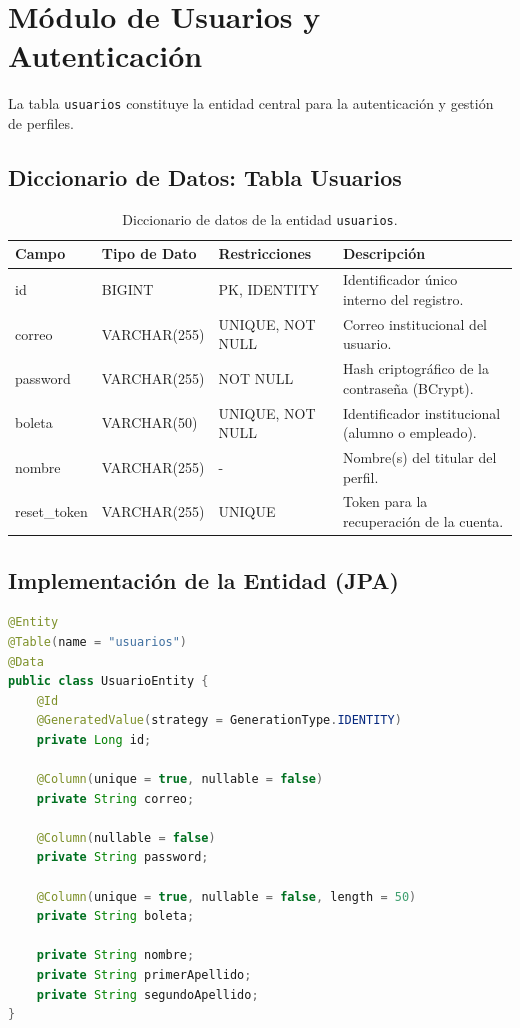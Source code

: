 \section{Módulo de Usuarios y Autenticación}
La tabla \texttt{usuarios} constituye la entidad central para la autenticación y gestión de perfiles.

\subsection{Diccionario de Datos: Tabla Usuarios}
\begin{table}[H]
\centering
\small
\begin{tabularx}{\textwidth}{|l|l|l|X|}
\hline
\rowcolor{azulESCOM} 
\color{white}\textbf{Campo} & \color{white}\textbf{Tipo de Dato} & \color{white}\textbf{Restricciones} & \color{white}\textbf{Descripción} \\ \hline
id & BIGINT & PK, IDENTITY & Identificador único interno del registro. \\ \hline
correo & VARCHAR(255) & UNIQUE, NOT NULL & Correo institucional del usuario. \\ \hline
password & VARCHAR(255) & NOT NULL & Hash criptográfico de la contraseña (BCrypt). \\ \hline
boleta & VARCHAR(50) & UNIQUE, NOT NULL & Identificador institucional (alumno o empleado). \\ \hline
nombre & VARCHAR(255) & - & Nombre(s) del titular del perfil. \\ \hline
reset\_token & VARCHAR(255) & UNIQUE & Token para la recuperación de la cuenta. \\ \hline
\end{tabularx}
\caption{Diccionario de datos de la entidad \texttt{usuarios}.}
\label{tab:dict_usuarios}
\end{table}

\subsection{Implementación de la Entidad (JPA)}
\begin{lstlisting}[language=Java, caption={Entidad Java para la gestión de usuarios.}, label={lst:java_usuario}]
@Entity
@Table(name = "usuarios")
@Data
public class UsuarioEntity {
    @Id
    @GeneratedValue(strategy = GenerationType.IDENTITY)
    private Long id;

    @Column(unique = true, nullable = false)
    private String correo;
    
    @Column(nullable = false)
    private String password;
    
    @Column(unique = true, nullable = false, length = 50)
    private String boleta;
    
    private String nombre;
    private String primerApellido;
    private String segundoApellido;
}
\end{lstlisting}

